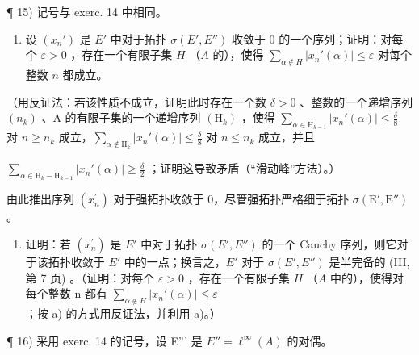 ¶ 15) 记号与 exerc. 14 中相同。

\begin{enumerate}
\def\labelenumi{\alph{enumi})}
\tightlist
\item
  设 \((x_n')\) 是 \(E'\) 中对于拓扑 \(\sigma(E', E'')\) 收敛于 0 的一个序列；证明：对每个 \(\varepsilon > 0\) ，存在一个有限子集 \(H\) （\(A\) 的），使得 \(\sum_{\alpha \notin H} |x_n'(\alpha)| \leqslant \varepsilon\) 对每个整数 \(n\) 都成立。
\end{enumerate}

（用反证法：若该性质不成立，证明此时存在一个数 \(\delta > 0\) 、整数的一个递增序列 \((n_k)\) 、A 的有限子集的一个递增序列 \((\mathrm{H}_k)\) ，使得 \(\sum_{\alpha \in \mathrm{H}_{k-1}} |x_n'(\alpha)| \leqslant \frac{\delta}{8}\) 对 \(n \geqslant n_k\) 成立，\(\sum_{\alpha \notin \mathrm{H}_k} |x_n'(\alpha)| \leqslant \frac{\delta}{8}\) 对 \(n \leqslant n_k\) 成立，并且

\(\sum_{\alpha \in \mathrm{H}_k - \mathrm{H}_{k-1}} |x_n'(\alpha)| \geqslant \frac{\delta}{2}\) ；证明这导致矛盾（“滑动峰”方法）。）

由此推出序列 \((x_{n}^{\prime})\) 对于强拓扑收敛于 0，尽管强拓扑严格细于拓扑 \(\sigma (\mathrm{E}',\mathrm{E}'')\) 。

\begin{enumerate}
\def\labelenumi{\alph{enumi})}
\setcounter{enumi}{1}
\tightlist
\item
  证明：若 \((x_{n}^{\prime})\) 是 \(E'\) 中对于拓扑 \(\sigma(E', E'')\) 的一个 Cauchy 序列，则它对于该拓扑收敛于 \(E'\) 中的一点；换言之，\(E'\) 对于 \(\sigma(E', E'')\) 是半完备的 (III, 第 7 页) 。（证明：对每个 \(\varepsilon > 0\) ，存在一个有限子集 \(H\) （\(A\) 中的），使得对每个整数 n 都有 \(\sum_{\alpha \notin H} |x_{n}'(\alpha)| \leqslant \varepsilon\) ；按 a) 的方式用反证法，并利用 a)。）
\end{enumerate}

¶ 16) 采用 exerc. 14 的记号，设 E''' 是 \(E'' = \ell^{\infty}(A)\) 的对偶。

